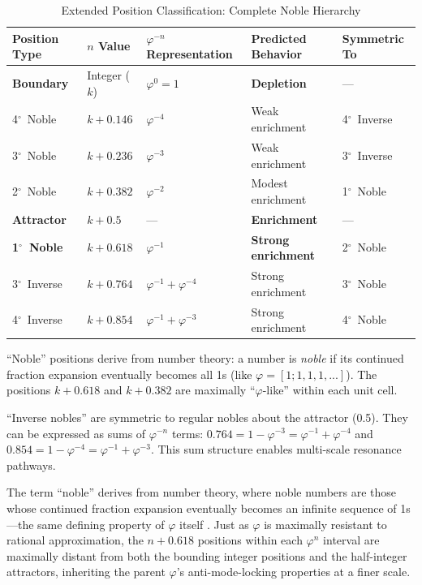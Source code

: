 \documentclass[11pt,a4paper]{article}
\newcommand{\degree}{$^\circ$}  %
\newcommand{\phisym}{\varphi}
\begin{document}
\begin{table}[H]
\centering
\begin{threeparttable}
\caption{Extended Position Classification: Complete Noble Hierarchy}
\label{tab:position_classification}
\begin{tabular}{@{}lllll@{}}
\toprule
Position Type & $n$ Value & $\phisym^{-n}$ Representation & Predicted Behavior & Symmetric To \\
\midrule
\textbf{Boundary} & Integer ($k$) & $\phisym^0 = 1$ & \textbf{Depletion} & --- \\
4\degree\ Noble & $k + 0.146$ & $\phisym^{-4}$ & Weak enrichment & 4\degree\ Inverse \\
3\degree\ Noble & $k + 0.236$ & $\phisym^{-3}$ & Weak enrichment & 3\degree\ Inverse \\
2\degree\ Noble\tnote{*} & $k + 0.382$ & $\phisym^{-2}$ & Modest enrichment & 1\degree\ Noble \\
\textbf{Attractor} & $k + 0.5$ & --- & \textbf{Enrichment} & --- \\
\textbf{1\degree\ Noble}\tnote{*} & $k + 0.618$ & $\phisym^{-1}$ & \textbf{Strong enrichment} & 2\degree\ Noble \\
3\degree\ Inverse\tnote{$\dagger$} & $k + 0.764$ & $\phisym^{-1} + \phisym^{-4}$ & Strong enrichment & 3\degree\ Noble \\
4\degree\ Inverse\tnote{$\dagger$} & $k + 0.854$ & $\phisym^{-1} + \phisym^{-3}$ & Strong enrichment & 4\degree\ Noble \\
\bottomrule
\end{tabular}
\begin{tablenotes}
\small
\item[*] ``Noble'' positions derive from number theory: a number is \textit{noble} if its continued fraction expansion eventually becomes all 1s (like $\phisym = [1; 1, 1, 1, ...]$). The positions $k + 0.618$ and $k + 0.382$ are maximally ``$\phisym$-like'' within each unit cell.
\item[$\dagger$] ``Inverse nobles'' are symmetric to regular nobles about the attractor (0.5). They can be expressed as sums of $\phisym^{-n}$ terms: $0.764 = 1 - \phisym^{-3} = \phisym^{-1} + \phisym^{-4}$ and $0.854 = 1 - \phisym^{-4} = \phisym^{-1} + \phisym^{-3}$. This sum structure enables multi-scale resonance pathways.
\end{tablenotes}
\end{threeparttable}
\end{table}

The term ``noble'' derives from number theory, where noble numbers are those whose continued fraction expansion eventually becomes an infinite sequence of 1s---the same defining property of $\phisym$ itself \parencite{hardy1979introduction}. Just as $\phisym$ is maximally resistant to rational approximation, the $n + 0.618$ positions within each $\phisym^n$ interval are maximally distant from both the bounding integer positions and the half-integer attractors, inheriting the parent $\phisym$'s anti-mode-locking properties at a finer scale.
\end{document}
